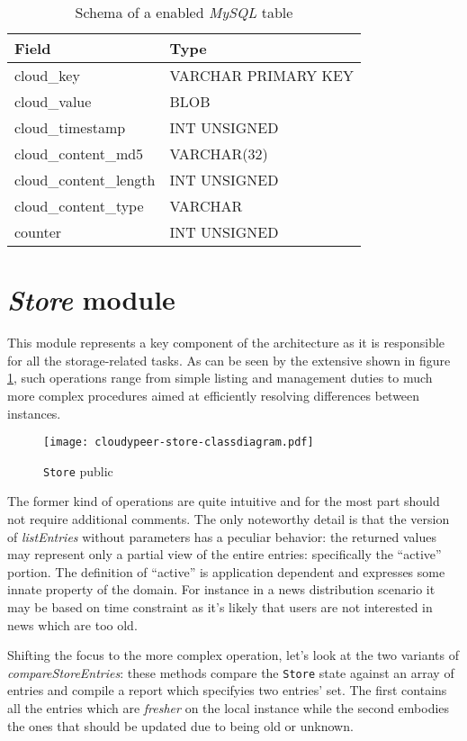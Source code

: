 \begin{table}[H]
  \centering
  \begin{tabular}{|l|l|}
  \hline
  Field & Type \\
  \hline
  \hline
  cloud\_key & VARCHAR PRIMARY KEY \\
  cloud\_value & BLOB \\
  cloud\_timestamp &  INT UNSIGNED \\
  cloud\_content\_md5 &  VARCHAR(32) \\
  cloud\_content\_length &  INT UNSIGNED \\
  cloud\_content\_type & VARCHAR \\
  counter & INT UNSIGNED \\
  \hline
  \end{tabular}
  \caption{Schema of a \cloud enabled \textit{MySQL} table}
  \label{tbl:mysql-cloud}
\end{table}

\section{\textit{Store} module}
This module represents a key component of the \cloudypeer architecture
as it is responsible for all the storage-related tasks. As can be seen
by the extensive \api shown in figure
\ref{fig:cloudypeer-store-class}, such operations range from simple
listing and management duties to much more complex procedures aimed at
efficiently resolving differences between instances.

\begin{figure}[h!]
  \centering
  \texttt{[image: cloudypeer-store-classdiagram.pdf]}
  \caption{\texttt{Store} public \api}
  \label{fig:cloudypeer-store-class}
\end{figure}

The former kind of operations are quite intuitive and for the most
part should not require additional comments. The only noteworthy
detail is that the version of \textit{listEntries} without parameters
has a peculiar behavior: the returned values may represent only a
partial view of the entire entries: specifically the ``active''
portion. The definition of ``active'' is application dependent and
expresses some innate property of the domain. For instance in a news
distribution scenario it may be based on time constraint as it's likely
that users are not interested in news which are too old.

Shifting the focus to the more complex operation, let's look at the
two variants of
\textit{compareStoreEntries}: these methods compare the \texttt{Store}
state against an array of entries and compile a report which specifyies
two entries' set. The first contains all the entries
which are \textit{fresher} on the local instance while the second embodies
the ones that should be updated due to being old or unknown.

